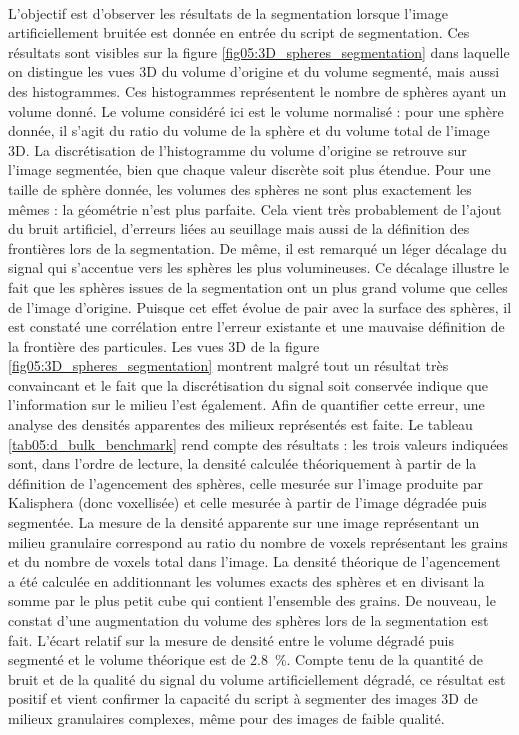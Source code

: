 \\L'objectif est d'observer les résultats de la segmentation lorsque l'image artificiellement bruitée est donnée en entrée du script de segmentation. Ces résultats sont visibles sur la figure \ref{fig05:3D_spheres_segmentation} dans laquelle on distingue les vues 3D du volume d'origine et du volume segmenté, mais aussi des histogrammes. Ces histogrammes représentent le nombre de sphères ayant un volume donné. Le volume considéré ici est le volume normalisé : pour une sphère donnée, il s'agit du ratio du volume de la sphère et du volume total de l'image 3D. La discrétisation de l'histogramme du volume d'origine se retrouve sur l'image segmentée, bien que chaque valeur discrète soit plus étendue. Pour une taille de sphère donnée, les volumes des sphères ne sont plus exactement les mêmes : la géométrie n'est plus parfaite. Cela vient très probablement de l'ajout du bruit artificiel, d'erreurs liées au seuillage mais aussi de la définition des frontières lors de la segmentation. De même, il est remarqué un léger décalage du signal qui s'accentue vers les sphères les plus volumineuses. Ce décalage illustre le fait que les sphères issues de la segmentation ont un plus grand volume que celles de l'image d'origine. Puisque cet effet évolue de pair avec la surface des sphères, il est constaté une corrélation entre l'erreur existante et une mauvaise définition de la frontière des particules. Les vues 3D de la figure \ref{fig05:3D_spheres_segmentation} montrent malgré tout un résultat très convaincant et le fait que la discrétisation du signal soit conservée indique que l'information sur le milieu l'est également. Afin de quantifier cette erreur, une analyse des densités apparentes des milieux représentés est faite. Le tableau \ref{tab05:d_bulk_benchmark} rend compte des résultats : les trois valeurs indiquées sont, dans l'ordre de lecture, la densité calculée théoriquement à partir de la définition de l'agencement des sphères, celle mesurée sur l'image produite par Kalisphera (donc voxellisée) et celle mesurée à partir de l'image dégradée puis segmentée. La mesure de la densité apparente sur une image représentant un milieu granulaire correspond au ratio du nombre de voxels représentant les grains et du nombre de voxels total dans l'image. La densité théorique de l'agencement a été calculée en additionnant les volumes exacts des sphères et en divisant la somme par le plus petit cube qui contient l'ensemble des grains. De nouveau, le constat d'une augmentation du volume des sphères lors de la segmentation est fait. L'écart relatif sur la mesure de densité entre le volume dégradé puis segmenté et le volume théorique est de \SI{2.8}{\percent}. Compte tenu de la quantité de bruit et de la qualité du signal du volume artificiellement dégradé, ce résultat est positif et vient confirmer la capacité du script à segmenter des images 3D de milieux granulaires complexes, même pour des images de faible qualité.
